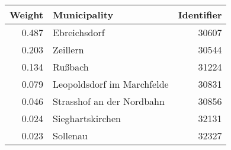 
\begin{tabular}{rlr}
\toprule
Weight & Municipality & Identifier\\
\midrule
0.487 & Ebreichsdorf & 30607\\
0.203 & Zeillern & 30544\\
0.134 & Rußbach & 31224\\
0.079 & Leopoldsdorf im Marchfelde & 30831\\
0.046 & Strasshof an der Nordbahn & 30856\\
0.024 & Sieghartskirchen & 32131\\
0.023 & Sollenau & 32327\\
\bottomrule
\end{tabular}
